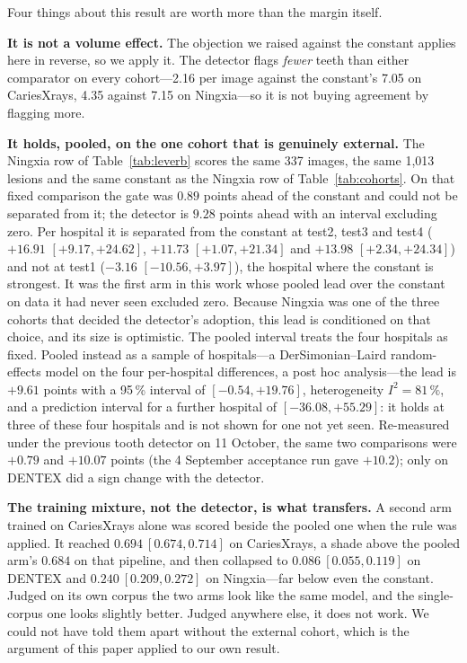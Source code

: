\documentclass[conference]{IEEEtran}
\begin{document}
Four things about this result are worth more than the margin itself.

\textbf{It is not a volume effect.} The objection we raised against the constant
applies here in reverse, so we apply it. The detector flags \emph{fewer} teeth than
either comparator on every cohort---2.16 per image against the constant's 7.05 on
CariesXrays, 4.35 against 7.15 on Ningxia---so it is not buying agreement by
flagging more.

\textbf{It holds, pooled, on the one cohort that is genuinely external.} The
Ningxia row of Table~\ref{tab:leverb} scores the same 337 images, the same
1{,}013 lesions and the same constant as the Ningxia row of
Table~\ref{tab:cohorts}. On that fixed comparison the gate was $0.89$ points ahead
of the constant and could not be separated from it; the detector is $9.28$ points
ahead with an interval excluding zero. Per hospital it is separated from the
constant at test2, test3 and test4 ($+16.91$ $[+9.17, +24.62]$, $+11.73$
$[+1.07, +21.34]$ and $+13.98$ $[+2.34, +24.34]$) and not at test1 ($-3.16$
$[-10.56, +3.97]$), the hospital where the constant is strongest. It was the first
arm in this work whose pooled lead over the constant on data it had never seen
excluded zero. Because Ningxia was
one of the three cohorts that decided the detector's adoption, this lead is
conditioned on that choice, and its size is optimistic. The pooled interval treats
the four hospitals as fixed. Pooled instead as a sample of hospitals---a
DerSimonian--Laird random-effects model on the four per-hospital differences, a
post hoc analysis---the lead is $+9.61$ points with a 95\,\% interval of
$[-0.54, +19.76]$, heterogeneity $I^2 = 81\,\%$, and a prediction interval for a
further hospital of $[-36.08, +55.29]$: it holds at three of these four hospitals
and is not shown for one not yet seen. Re-measured under the previous tooth
detector on 11 October, the same two comparisons were $+0.79$ and $+10.07$ points
(the 4 September acceptance run gave $+10.2$); only on DENTEX did a sign change
with the detector.

\textbf{The training mixture, not the detector, is what transfers.} A second arm
trained on CariesXrays alone was scored beside the pooled one when the rule was
applied. It reached $0.694\ [0.674, 0.714]$ on CariesXrays, a shade above the
pooled arm's $0.684$ on that pipeline, and then collapsed to
$0.086\ [0.055, 0.119]$ on DENTEX and $0.240\ [0.209, 0.272]$ on Ningxia---far
below even the constant. Judged on its own corpus the two arms look like the same
model, and the single-corpus one looks slightly better. Judged anywhere else, it
does not work. We could not have told them apart without the external cohort,
which is the argument of this paper applied to our own result.
\end{document}
